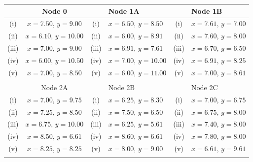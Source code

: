 \documentclass[12pt]{article}
\begin{document}
		\normalsize	
		\begin{tabular}{||c|c||c|l||c|l||}
			\hline  & Node 0 &   & Node 1A &  & Node 1B     \\  \hline
			\hline (i) & $x=7.50$, $y=9.00$ & (i) & $x=6.50$, $y = 8.50$ &  (i)  & $x=7.61$, $y=7.00$\\  \hline
			\hline (ii)  & $x=6.10$, $y =10.00 $  &  (ii) & $x=6.00$, $y = 8.91$ & (ii) & $x=7.60$, $y = 8.00 $ \\  \hline
			\hline (iii) & $x=7.00$, $y =9.00$  & (iii) & $x=6.91$, $y = 7.61 $ & (iii) & $x=6.70$, $y = 6.50$ \\  \hline
			\hline (iv)  & $x=6.00$, $y = 10.50$  &  (iv) & $x=7.00$, $y = 10.00$  & (iv)  & $x=6.91$, $y=8.25$\\  \hline
			\hline (v) & $x=7.00$, $y = 8.50$ & (v)  & $x=6.00$, $y=11.00$ & (v) & $x=7.00$, $y = 8.61$\\  \hline & & & & & \\
			\hline 
			
			\hline  & Node 2A &   & Node 2B &  & Node 2C  \\  \hline
			\hline (i) & $x=7.00$, $y=9.75$ & (i)  & $x=6.25 $, $y = 8.30 $  & (i)  & $x=7.00$, $y = 6.75$\\  \hline
			\hline (ii)  & $x=7.25$, $y = 8.50$  &  (ii) &$x=7.50$, $y = 6.50$ & (ii) & $x=6.75$, $y = 8.00 $ \\  \hline
			\hline (iii) & $x=6.75  $, $y = 10.00 $  &  (iii) &$x=6.25 $, $y = 5.61 $ &  (iii) & $x=7.40$, $y = 8.00$ \\  \hline
			\hline (iv)  & $x=8.50$, $y = 6.61 $  & (iv) & $x=8.60 $, $y = 6.61 $ & (iv)  & $x=7.80$, $y =8.00$\\  \hline
			\hline (v) & $x=8.25 $, $y = 8.25 $ & (v) & $x=8.00$, $y=9.00$  &(v) & $x=6.61$, $y = 9.61$\\  \hline & & & & & \\
			\hline 
		\end{tabular} 
		\newpage	
\end{document}

